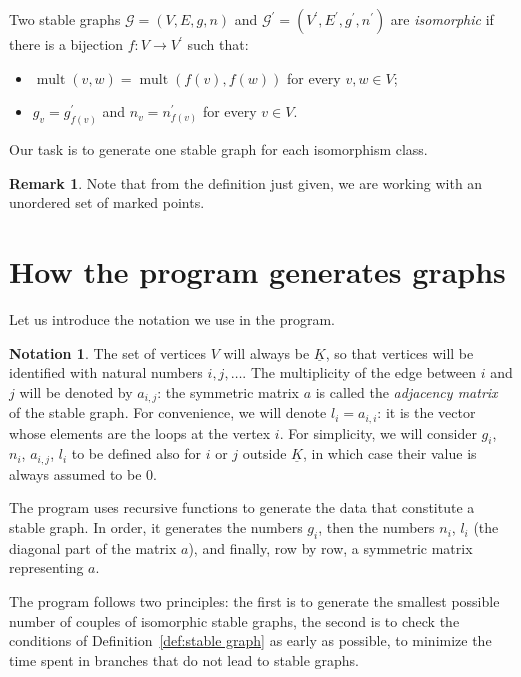 \documentclass{amsart}
\theoremstyle{plain}
\theoremstyle{definition}
\newtheorem{remark}[theorem]{Remark}
\newtheorem{notation}[theorem]{Notation}
\DeclareMathOperator{\mult}{mult}
\newcommand{\graph}{\mathcal{G}}
\newcommand{\ubar}[1]{\underline{#1}}
\begin{document}
Two stable graphs $\graph = (V, E, g, n)$ and $\graph^\prime =
(V^\prime, E^\prime, g^\prime, n^\prime)$ are \emph{isomorphic\/} if
there is a bijection $f\colon V \to V^\prime$ such that:
\begin{itemize}
\item $\mult(v, w) = \mult(f(v), f(w))$ for every $v, w \in V$;
\item $g_v = g^\prime_{f(v)}$ and $n_v = n^\prime_{f(v)}$ for every $v
  \in V$.
\end{itemize}
Our task is to generate one stable graph for each isomorphism class.

\begin{remark}
  Note that from the definition just given, we are working with an
  unordered set of marked points.
\end{remark}



\section{How the program generates graphs}

Let us introduce the notation we use in the program.

\begin{notation}\label{not:gnla}
  The set of vertices $V$ will always be $\ubar{K}$, so that vertices
  will be identified with natural numbers $i, j, \dots$. The
  multiplicity of the edge between $i$ and $j$ will be denoted by
  $a_{i,j}$: the symmetric matrix $a$ is called the \emph{adjacency
    matrix} of the stable graph. For convenience, we will denote $l_i
  = a_{i,i}$: it is the vector whose elements are the loops at the
  vertex $i$. For simplicity, we will consider $g_i$, $n_i$,
  $a_{i,j}$, $l_i$ to be defined also for $i$ or $j$ outside
  $\ubar{K}$, in which case their value is always assumed to be $0$.
\end{notation}

The program uses recursive functions to generate the data that
constitute a stable graph. In order, it generates the numbers $g_i$,
then the numbers $n_i$, $l_i$ (the diagonal part of the matrix $a$),
and finally, row by row, a symmetric matrix representing $a$.

The program follows two principles: the first is to generate the
smallest possible number of couples of isomorphic stable graphs, the
second is to check the conditions of Definition~\ref{def:stable graph}
as early as possible, to minimize the time spent in branches that do
not lead to stable graphs.
\end{document}
